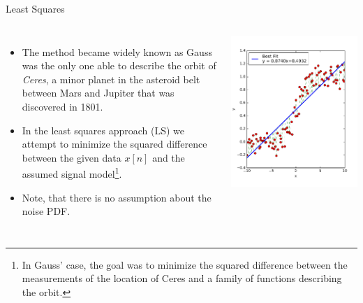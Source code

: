 \documentclass[10pt, aspectratio=169]{beamer} %
\begin{document}
\begin{frame}[allowframebreaks=0.8]
 {Least Squares}
\begin{columns}
 \begin{itemize}
\item The method became widely known as Gauss was the only one able to describe
the orbit of \emph{Ceres}, a minor planet in the asteroid belt between 
Mars and Jupiter that was discovered in 1801.
  \item In the least squares approach (LS) we attempt to minimize the
  squared difference between the given data $x[n]$ and the assumed
  signal model\footnote[frame]{\tiny In Gauss' case, the goal was to minimize
the squared difference between the measurements of the location of Ceres and
a family of functions describing the orbit.\vspace*{0.4cm}}.
\item Note, that there is no assumption about the noise PDF.
\end{itemize}
\centerline{\includegraphics[width=\textwidth]{LSEx1Solution.pdf}}
\end{columns}
\end{frame}
\end{document}
